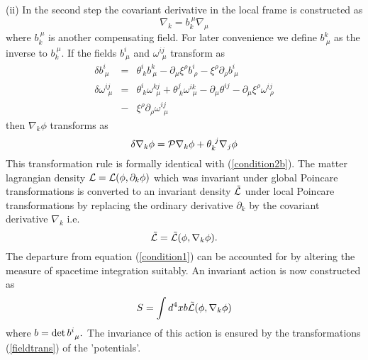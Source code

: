 \documentclass[12pt]{article}
\begin{document}
(ii) In the second step the covariant derivative in the local frame is constructed as 
\begin{equation}
\nabla_k = b_k^{\ \mu}\nabla_\mu\label{covder}
\end{equation}
where $b_k^{\ \mu}$ is another compensating field. For later convenience we define
$b^k_{\ \mu}$ as the inverse to $b_k^{\ \mu}$. 
If the fields $b^i_{\ \mu}$ and $\omega^{ij}_{\ \ \mu}$ transform as 
\begin{eqnarray}
\delta b^i_{\ \mu} &=& \theta^i_{\ k} b^k_{\ \mu} - \partial_\mu\xi^\rho b^i_{\ \rho} - \xi^{\rho}\partial_{\rho} b^i_{\ \mu}\nonumber\\
\delta \omega^{ij}_{\ \ \mu} &=& \theta^i_{\ k} \omega^{kj}_{\ \ \mu} + \theta^j_{\ k} \omega^{ik}_{\ \ \mu} - \partial_\mu\theta^{ij} - \partial_\mu\xi^\rho \omega^{ij}_{\ \ \rho}\nonumber
\\
 &-& \xi^{\rho}\partial_{\rho}\omega^{ij}_{\ \ \mu}\label{fieldtrans}
\end{eqnarray} 
then  $\nabla_k\phi$
 transforms as 
\begin{equation}
\delta\nabla_k\phi = {\cal{P}}\nabla_k\phi + \theta_k^{\ j}\nabla_j\phi\label{C}
\end{equation}
This transformation rule is formally identical with
 (\ref{condition2b}).
  The matter lagrangian density ${\cal{L}} = {\cal{L}}(\phi,\partial_{k}\phi)$ which was invariant under global Poincare transformations is converted to an invariant density ${\cal{\tilde{L}}}$ under local Poincare transformations by replacing the ordinary derivative $\partial_{k}$ by the covariant derivative $\nabla_k $ i.e. 
$${\cal{\tilde{L}}} = {\cal{\tilde{L}}}(\phi,\nabla_{k}\phi).$$ 
The departure from equation (\ref{condition1}) can be accounted for by altering the measure of spacetime integration suitably. An invariant action is now constructed as 
\begin{equation} S = \int d^4x b{\cal{\tilde{L}}}(\phi,\nabla_{k}\phi)\label{m}
\end{equation}
 where $b = {\rm det}\,b^i_{\ \mu}.$ The invariance of this action is ensured by the transformations (\ref{fieldtrans}) of the 'potentials'.
\end{document}
